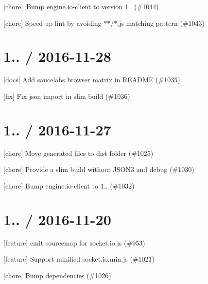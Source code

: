 \begin{DoxyItemize}
\item \mbox{[}chore\mbox{]} \+Bump engine.\+io-\/client to version 1.. (\#1044)
\item \mbox{[}chore\mbox{]} Speed up lint by avoiding \textquotesingle{}$\ast$$\ast$/$\ast$.js\textquotesingle{} matching pattern (\#1043)
\end{DoxyItemize}

\section*{1.. / 2016-\/11-\/28 }


\begin{DoxyItemize}
\item \mbox{[}docs\mbox{]} Add saucelabs browser matrix in R\+E\+A\+D\+ME (\#1035)
\item \mbox{[}fix\mbox{]} Fix json import in slim build (\#1036)
\end{DoxyItemize}

\section*{1.. / 2016-\/11-\/27 }


\begin{DoxyItemize}
\item \mbox{[}chore\mbox{]} Move generated files to {\ttfamily dist} folder (\#1025)
\item \mbox{[}chore\mbox{]} Provide a slim build without J\+S\+O\+N3 and debug (\#1030)
\item \mbox{[}chore\mbox{]} Bump engine.\+io-\/client to 1.. (\#1032)
\end{DoxyItemize}

\section*{1.. / 2016-\/11-\/20 }


\begin{DoxyItemize}
\item \mbox{[}feature\mbox{]} emit sourcemap for socket.\+io.\+js (\#953)
\item \mbox{[}feature\mbox{]} Support minified {\ttfamily socket.\+io.\+min.\+js} (\#1021)
\item \mbox{[}chore\mbox{]} Bump dependencies (\#1026)
\end{DoxyItemize}

